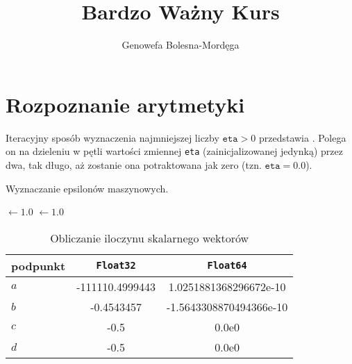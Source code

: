 \documentclass[11pt]{mk-polish-lab-report}
\author{Genowefa Bolesna-Mordęga}
\title{Bardzo Ważny Kurs}
\begin{document}
\maketitle

\section{Rozpoznanie arytmetyki}

Iteracyjny sposób wyznaczenia najmniejszej liczby $\mathtt{eta} > 0$ przedstawia . Polega on na dzieleniu w pętli wartości zmiennej \texttt{eta} (zainicjalizowanej jedynką) przez dwa, tak długo, aż zostanie ona potraktowana jak zero (tzn. $\mathtt{eta} = 0.0$).

\begin{algorithm}[h]
\caption{Wyznaczanie epsilonów maszynowych.}
\label{alg:macheps}

\Macheps $\leftarrow 1.0$\;
\NMacheps $\leftarrow 1.0$\;
\Return \Macheps
\end{algorithm}

\lipsum[1-2]

	\begin{table}[!h]
        \centering
        \footnotesize
		\begin{tabular}{lSS}
		\toprule
			{podpunkt} & {\texttt{Float32}} & {\texttt{Float64}} \\ \midrule
			$a$ & -111110.4999443 & 1.0251881368296672e-10 \\ 
 			$b$ & -0.4543457 & -1.5643308870494366e-10 \\
 			$c$ & -0.5 & 0.0e0 \\
 			$d$ & -0.5 & 0.0e0 \\\bottomrule
 		\end{tabular}
 		\caption{Obliczanie iloczynu skalarnego wektorów}
		\label{table:8}
	\end{table}	


\lipsum[3-5]
\end{document}
